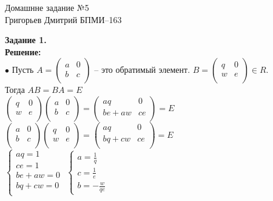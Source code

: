 \documentclass[12pt,a4paper]{scrartcl}
\begin{document}
	\begin{center}	
		Домашнне задание №5 \\
		Григорьев Дмитрий БПМИ--163
	\end{center}
	\textbf{Задание 1.}
	\\
	\textbf{Решение:}
	\\
	$\bullet$ 
	Пусть $A = \begin{pmatrix}
	a&0\\
	b&c\\
	\end{pmatrix}$ -- это обратимый элемент. $B = \begin{pmatrix}
	q&0\\
	w&e\\
	\end{pmatrix} \in R$.\\
	Тогда $AB = BA = E$ \\
	$\begin{pmatrix}
		q&0\\
		w&e\\
	\end{pmatrix} \begin{pmatrix}
		a&0\\
		b&c\\
	\end{pmatrix} = \begin{pmatrix}
	aq&0\\
	be + aw&ce\\
	\end{pmatrix} = E$\\
	$\begin{pmatrix}
	a&0\\
	b&c\\
	\end{pmatrix} \begin{pmatrix}
	q&0\\
	w&e\\
	\end{pmatrix} = \begin{pmatrix}
	aq&0\\
	bq + cw&ce\\
	\end{pmatrix} = E$\\
	$\begin{cases}
	aq = 1\\
	ce = 1\\
	be + aw = 0\\
	bq + cw = 0\\
	\end{cases}$
	$\begin{cases}
	a = \frac{1}{q}\\
	c = \frac{1}{e}\\
	b = -\frac{w}{qe}
	\end{cases}$\\
\end{document}
